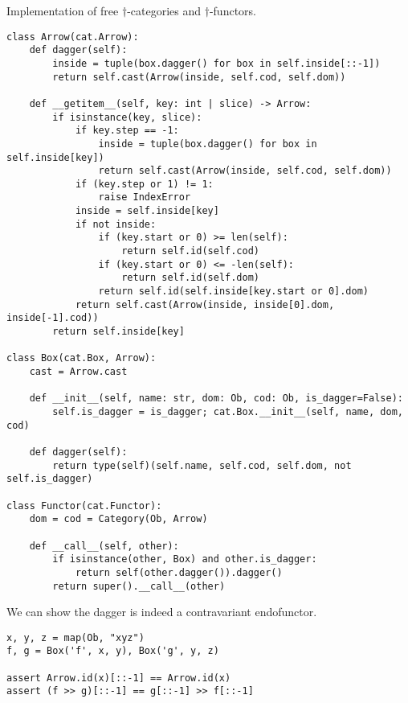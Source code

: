 \begin{python}
{\normalfont Implementation of free $\dagger$-categories and $\dagger$-functors.}
\begin{verbatim}
class Arrow(cat.Arrow):
    def dagger(self):
        inside = tuple(box.dagger() for box in self.inside[::-1])
        return self.cast(Arrow(inside, self.cod, self.dom))

    def __getitem__(self, key: int | slice) -> Arrow:
        if isinstance(key, slice):
            if key.step == -1:
                inside = tuple(box.dagger() for box in self.inside[key])
                return self.cast(Arrow(inside, self.cod, self.dom))
            if (key.step or 1) != 1:
                raise IndexError
            inside = self.inside[key]
            if not inside:
                if (key.start or 0) >= len(self):
                    return self.id(self.cod)
                if (key.start or 0) <= -len(self):
                    return self.id(self.dom)
                return self.id(self.inside[key.start or 0].dom)
            return self.cast(Arrow(inside, inside[0].dom, inside[-1].cod))
        return self.inside[key]

class Box(cat.Box, Arrow):
    cast = Arrow.cast

    def __init__(self, name: str, dom: Ob, cod: Ob, is_dagger=False):
        self.is_dagger = is_dagger; cat.Box.__init__(self, name, dom, cod)

    def dagger(self):
        return type(self)(self.name, self.cod, self.dom, not self.is_dagger)

class Functor(cat.Functor):
    dom = cod = Category(Ob, Arrow)

    def __call__(self, other):
        if isinstance(other, Box) and other.is_dagger:
            return self(other.dagger()).dagger()
        return super().__call__(other)
\end{verbatim}
\end{python}

\begin{example}
We can show the dagger is indeed a contravariant endofunctor.

\begin{verbatim}
x, y, z = map(Ob, "xyz")
f, g = Box('f', x, y), Box('g', y, z)

assert Arrow.id(x)[::-1] == Arrow.id(x)
assert (f >> g)[::-1] == g[::-1] >> f[::-1]
\end{verbatim}
\end{example}

